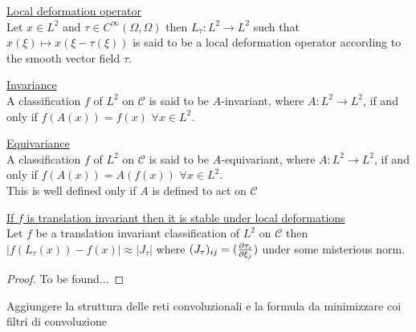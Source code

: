 \documentclass[../main.tex]{subfiles}
\begin{document}
\begin{defn}\underline{Local deformation operator}\\
Let $x \in L^2$ and $\tau \in C^\infty(\Omega,\Omega)$ then $L_\tau:L^2 \to L^2$ such that $x(\xi) \mapsto x(\xi-\tau(\xi))$
is said to be a local deformation operator according to the smooth vector field $\tau$.
\end{defn}

\begin{defn}\underline{Invariance}\\
A classification $f$ of $L^2$ on $\mathcal{C}$ is said to be $A$-invariant, where
$A:L^2 \to L^2$, if and only if $f(A(x))=f(x)$  $\forall x \in L^2$.
\end{defn}

\begin{defn}\underline{Equivariance}\\
A classification $f$ of $L^2$ on $\mathcal{C}$ is said to be $A$-equivariant, where
$A:L^2 \to L^2$, if and only if $f(A(x))=A(f(x))$  $\forall x \in L^2$.\\
This is well defined only if $A$ is defined to act on $\mathcal{C}$
\end{defn}

\begin{prop}\underline{If $f$ is translation invariant then it is stable under local deformations}\\
Let $f$ be a translation invariant classification of $L^2$ on $\mathcal{C}$
then $|f(L_\tau(x))-f(x)|\approx |J_\tau|$ where $(J_\tau)_{ij}=(\frac{\partial \tau_i}{\partial \xi_j})$ under some misterious norm.
\end{prop}
\begin{proof}
To be found...
\end{proof}

Aggiungere la struttura delle reti convoluzionali e la formula da minimizzare coi filtri di convoluzione
\end{document}
